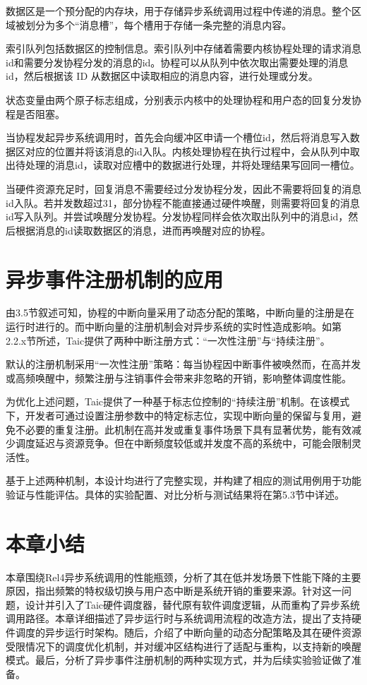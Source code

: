 数据区是一个预分配的内存块，用于存储异步系统调用过程中传递的消息。整个区域被划分为多个“消息槽”，每个槽用于存储一条完整的消息内容。

索引队列包括数据区的控制信息。索引队列中存储着需要内核协程处理的请求消息id和需要分发协程分发的消息的id。协程可以从队列中依次取出需要处理的消息id，然后根据该 ID 从数据区中读取相应的消息内容，进行处理或分发。

状态变量由两个原子标志组成，分别表示内核中的处理协程和用户态的回复分发协程是否阻塞。

当协程发起异步系统调用时，首先会向缓冲区申请一个槽位id，然后将消息写入数据区对应的位置并将该消息的id入队。内核处理协程在执行过程中，会从队列中取出待处理的消息id，读取对应槽中的数据进行处理，并将处理结果写回同一槽位。

当硬件资源充足时，回复消息不需要经过分发协程分发，因此不需要将回复的消息id入队。若并发数超过31，部分协程不能直接通过硬件唤醒，则需要将回复的消息id写入队列。并尝试唤醒分发协程。分发协程同样会依次取出队列中的消息id，然后根据消息的id读取数据区的消息，进而再唤醒对应的协程。

\section{异步事件注册机制的应用}

由3.5节叙述可知，协程的中断向量采用了动态分配的策略，中断向量的注册是在运行时进行的。而中断向量的注册机制会对异步系统的实时性造成影响。如第2.2.x节所述，Taic提供了两种中断注册方式：“一次性注册”与“持续注册”。

默认的注册机制采用“一次性注册”策略：每当协程因中断事件被唤然而，在高并发或高频唤醒中，频繁注册与注销事件会带来非忽略的开销，影响整体调度性能。

为优化上述问题，Taic提供了一种基于标志位控制的“持续注册”机制。在该模式下，开发者可通过设置注册参数中的特定标志位，实现中断向量的保留与复用，避免不必要的重复注册。此机制在高并发或重复事件场景下具有显著优势，能有效减少调度延迟与资源竞争。但在中断频度较低或并发度不高的系统中，可能会限制灵活性。

基于上述两种机制，本设计均进行了完整实现，并构建了相应的测试用例用于功能验证与性能评估。具体的实验配置、对比分析与测试结果将在第5.3节中详述。



\section{本章小结}

本章围绕Rel4异步系统调用的性能瓶颈，分析了其在低并发场景下性能下降的主要原因，指出频繁的特权级切换与用户态中断是系统开销的重要来源。针对这一问题，设计并引入了Taic硬件调度器，替代原有软件调度逻辑，从而重构了异步系统调用路径。本章详细描述了异步运行时与系统调用流程的改造方法，提出了支持硬件调度的异步运行时架构。随后，介绍了中断向量的动态分配策略及其在硬件资源受限情况下的调度优化机制，并对缓冲区结构进行了适配与重构，以支持新的唤醒模式。最后，分析了异步事件注册机制的两种实现方式，并为后续实验验证做了准备。